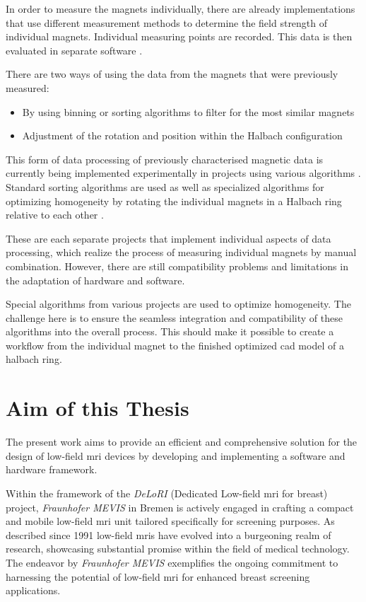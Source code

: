 In order to measure the magnets individually, there are already
implementations that use different measurement methods to determine the
field strength of individual magnets. Individual measuring points are
recorded. This data is then evaluated in separate software
\cite{Wickenbrock_2021}.

There are two ways of using the data from the magnets that were
previously measured:

\begin{itemize}
\tightlist
\item
  By using binning or sorting algorithms to filter for the most similar
  magnets
\item
  Adjustment of the rotation and position within the Halbach
  configuration
\end{itemize}

This form of data processing of previously characterised magnetic data
is currently being implemented experimentally in projects using various
algorithms \cite{Wickenbrock_2021}. Standard sorting algorithms are
used as well as specialized algorithms for optimizing homogeneity by
rotating the individual magnets in a Halbach ring relative to each other
\cite{HalbachMRIDesigner}.

These are each separate projects that implement individual aspects of
data processing, which realize the process of measuring individual
magnets by manual combination. However, there are still compatibility
problems and limitations in the adaptation of hardware and software.

Special algorithms from various projects are used to optimize
homogeneity. The challenge here is to ensure the seamless integration
and compatibility of these algorithms into the overall process. This
should make it possible to create a workflow from the individual magnet
to the finished optimized \gls{cad} model of a halbach ring.

\hypertarget{aim-of-this-thesis}{%
\section{Aim of this Thesis}\label{aim-of-this-thesis}}

The present work aims to provide an efficient and comprehensive solution
for the design of low-field \gls{mri} devices by developing and
implementing a software and hardware framework.

Within the framework of the \emph{DeLoRI} (Dedicated Low-field \gls{mri}
for breast) project, \emph{Fraunhofer MEVIS} in Bremen is actively
engaged in crafting a compact and mobile low-field \gls{mri} unit
tailored specifically for screening purposes. As described since 1991
low-field \gls{mri}s have evolved into a burgeoning realm of research,
showcasing substantial promise within the field of medical technology.
The endeavor by \emph{Fraunhofer MEVIS} exemplifies the ongoing
commitment to harnessing the potential of low-field \gls{mri} for
enhanced breast screening applications.

